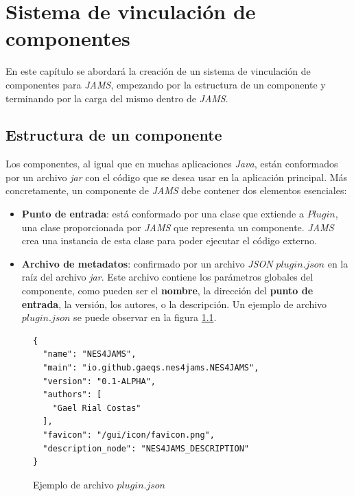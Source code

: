 \chapter{Sistema de vinculación de componentes}\label{ch:sistema-de-vinculacion-de-componentes}

  
En este capítulo se abordará la creación de un sistema de
vinculación de componentes para \textit{JAMS}, empezando por
la estructura de un componente y terminando por la carga
del mismo dentro de \textit{JAMS}.

\section{Estructura de un componente}\label{sec:estructura-de-un-componente}

Los componentes, al igual que en muchas aplicaciones \textit{Java},
están conformados por un archivo \textit{jar} con el código que
se desea usar en la aplicación principal.
Más concretamente, un componente de \textit{JAMS} debe contener
dos elementos esenciales:
\begin{itemize}
    \item \textbf{Punto de entrada}: está conformado por una
    clase que extiende a $Plugin$, una clase proporcionada por
    \textit{JAMS} que representa un componente.
    \textit{JAMS} crea una instancia de esta clase para
    poder ejecutar el código externo.
    \item \textbf{Archivo de metadatos}: confirmado por un archivo
    \textit{JSON}\cite{JSON} $plugin.json$ en la raíz del archivo \textit{jar}.
    Este archivo contiene los parámetros globales del componente,
    como pueden ser el \textbf{nombre}, la dirección del
    \textbf{punto de entrada}, la versión, los autores,
    o la descripción.
    Un ejemplo de archivo $plugin.json$ se puede observar en la
    figura \ref{fig:plugin-json}.
\end{itemize}


\begin{figure}[h]
    \centering
    \begin{lstlisting}[frame=single,label={lst:plugin-json}]
{
  "name": "NES4JAMS",
  "main": "io.github.gaeqs.nes4jams.NES4JAMS",
  "version": "0.1-ALPHA",
  "authors": [
    "Gael Rial Costas"
  ],
  "favicon": "/gui/icon/favicon.png",
  "description_node": "NES4JAMS_DESCRIPTION"
}
    \end{lstlisting}
    \caption{Ejemplo de archivo $plugin.json$}
    \label{fig:plugin-json}
\end{figure}

